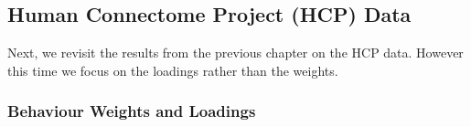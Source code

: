 %
%

\newpage
\subsection{Human Connectome Project (HCP) Data}

Next, we revisit the results from the previous chapter on the HCP data.
However this time we focus on the loadings rather than the weights.

\subsubsection{Behaviour Weights and Loadings}



